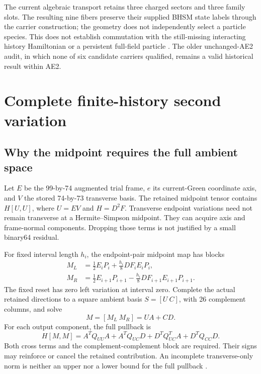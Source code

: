 \documentclass[11pt]{article}
\begin{document}
The current algebraic transport retains three charged sectors and three
family slots. The resulting nine fibers preserve their supplied BHSM state
labels through the carrier construction; the geometry does not independently
select a particle species. This does not establish commutation with the
still-missing interacting history Hamiltonian or a persistent full-field
particle \cite{status}. The older unchanged-AE2 audit, in which none of six
candidate carriers qualified, remains a valid historical result within AE2.

\section{Complete finite-history second variation}
\subsection{Why the midpoint requires the full ambient space}
Let \(E\) be the 99-by-74 augmented trial frame, \(e\) its current-Green
coordinate axis, and \(V\) the stored 74-by-73 transverse basis. The retained
midpoint tensor contains \(H[U,U]\), where \(U=EV\) and \(H=D^2F\).
Transverse endpoint variations need not remain transverse at a
Hermite--Simpson midpoint. They can acquire axis and frame-normal components.
Dropping those terms is not justified by a small binary64 residual.

For fixed interval length \(h_i\), the endpoint-pair midpoint map has blocks
\begin{align}
 M_L&=\tfrac12E_iP_i+\tfrac{h_i}{8}DF_iE_iP_i,\\
 M_R&=\tfrac12E_{i+1}P_{i+1}-\tfrac{h_i}{8}DF_{i+1}E_{i+1}P_{i+1}.
\end{align}
The fixed reset has zero left variation at interval zero. Complete the
actual retained directions to a square ambient basis \(S=[U\ C]\), with
26 complement columns, and solve
\begin{equation}
 M=[M_L\ M_R]=UA+CD.
\end{equation}
For each output component, the full pullback is
\begin{equation}\label{eq:fullpullback}
 H[M,M]=A^TQ_{UU}A+A^TQ_{UC}D
       +D^TQ_{UC}^TA+D^TQ_{CC}D.
\end{equation}
Both cross terms and the complement-complement block are required. Their
signs may reinforce or cancel the retained contribution. An incomplete
transverse-only norm is neither an upper nor a lower bound for the full
pullback \cite{signed}.
\end{document}
